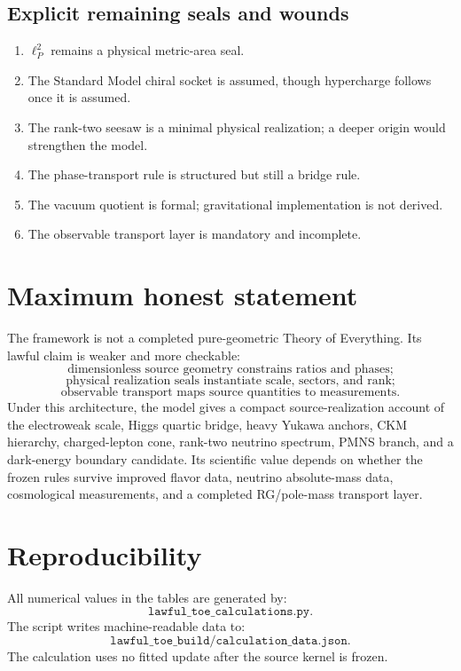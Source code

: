 \documentclass[11pt]{article}
\begin{document}
\subsection{Explicit remaining seals and wounds}

\begin{enumerate}[leftmargin=2em]
\item \(\ell_P^2\) remains a physical metric-area seal.
\item The Standard Model chiral socket is assumed, though hypercharge follows once it is assumed.
\item The rank-two seesaw is a minimal physical realization; a deeper origin would strengthen the model.
\item The phase-transport rule is structured but still a bridge rule.
\item The vacuum quotient is formal; gravitational implementation is not derived.
\item The observable transport layer is mandatory and incomplete.
\end{enumerate}

\section{Maximum honest statement}

The framework is not a completed pure-geometric Theory of Everything. Its lawful claim is weaker and more checkable:
\[
\boxed{
\text{dimensionless source geometry constrains ratios and phases;}
}
\]
\[
\boxed{
\text{physical realization seals instantiate scale, sectors, and rank;}
}
\]
\[
\boxed{
\text{observable transport maps source quantities to measurements.}
}
\]
Under this architecture, the model gives a compact source-realization account of the electroweak scale, Higgs quartic bridge, heavy Yukawa anchors, CKM hierarchy, charged-lepton cone, rank-two neutrino spectrum, PMNS branch, and a dark-energy boundary candidate. Its scientific value depends on whether the frozen rules survive improved flavor data, neutrino absolute-mass data, cosmological measurements, and a completed RG/pole-mass transport layer.

\appendix
\section{Reproducibility}

All numerical values in the tables are generated by:
\[
\texttt{lawful\_toe\_calculations.py}.
\]
The script writes machine-readable data to:
\[
\texttt{lawful\_toe\_build/calculation\_data.json}.
\]
The calculation uses no fitted update after the source kernel is frozen.
\end{document}
